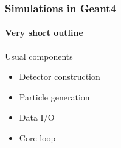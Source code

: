 \begin{frame}
\frametitle{Simulations in Geant4}
\framesubtitle{Very short outline}

\begin{block}{Usual components}
	\begin{itemize}
		\item Detector construction
		\item Particle generation
		\item Data I/O
		\item Core loop
	\end{itemize}
\end{block}


\begin{center}
\end{center}

\end{frame}